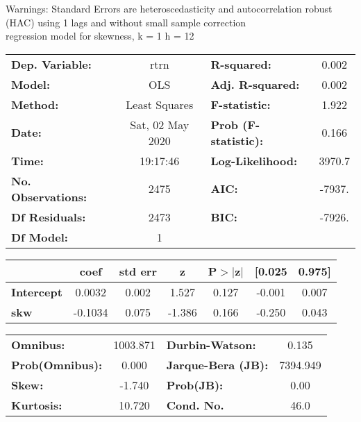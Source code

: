Warnings: \newline
 [1] Standard Errors are heteroscedasticity and autocorrelation robust (HAC) using 1 lags and without small sample correction\\ 

regression model for skewness, k = 1 h = 12\begin{center}
\begin{tabular}{lclc}
\toprule
\textbf{Dep. Variable:}    &       rtrn       & \textbf{  R-squared:         } &     0.002   \\
\textbf{Model:}            &       OLS        & \textbf{  Adj. R-squared:    } &     0.002   \\
\textbf{Method:}           &  Least Squares   & \textbf{  F-statistic:       } &     1.922   \\
\textbf{Date:}             & Sat, 02 May 2020 & \textbf{  Prob (F-statistic):} &    0.166    \\
\textbf{Time:}             &     19:17:46     & \textbf{  Log-Likelihood:    } &    3970.7   \\
\textbf{No. Observations:} &        2475      & \textbf{  AIC:               } &    -7937.   \\
\textbf{Df Residuals:}     &        2473      & \textbf{  BIC:               } &    -7926.   \\
\textbf{Df Model:}         &           1      & \textbf{                     } &             \\
\bottomrule
\end{tabular}
\begin{tabular}{lcccccc}
                   & \textbf{coef} & \textbf{std err} & \textbf{z} & \textbf{P$> |$z$|$} & \textbf{[0.025} & \textbf{0.975]}  \\
\midrule
\textbf{Intercept} &       0.0032  &        0.002     &     1.527  &         0.127        &       -0.001    &        0.007     \\
\textbf{skw}       &      -0.1034  &        0.075     &    -1.386  &         0.166        &       -0.250    &        0.043     \\
\bottomrule
\end{tabular}
\begin{tabular}{lclc}
\textbf{Omnibus:}       & 1003.871 & \textbf{  Durbin-Watson:     } &    0.135  \\
\textbf{Prob(Omnibus):} &   0.000  & \textbf{  Jarque-Bera (JB):  } & 7394.949  \\
\textbf{Skew:}          &  -1.740  & \textbf{  Prob(JB):          } &     0.00  \\
\textbf{Kurtosis:}      &  10.720  & \textbf{  Cond. No.          } &     46.0  \\
\bottomrule
\end{tabular}
\end{center}

